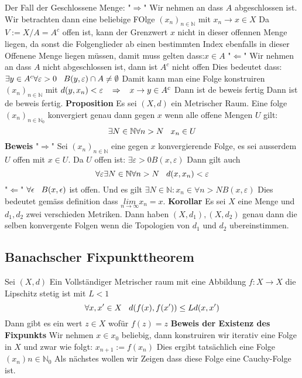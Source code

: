 \documentclass{article}
\newcommand{\mspc}{\hspace{0.3cm}}
\begin{document}
Der Fall der Geschlossene Menge:\newline
"$\Rightarrow$" Wir nehmen an dass $A$ abgeschlossen ist. Wir betrachten dann eine beliebige FOlge $(x_n)_{n\in\mathbb{N}}$ mit $x_n\rightarrow x\in X$ Da $V:=X/A=A^c$ offen ist, kann der Grenzwert $x$ nicht in dieser offennen Menge liegen, da sonst die Folgenglieder ab einen bestimmten Index ebenfalls in dieser Offenene Menge liegen müssen, damit muss gelten dass:$x\in A$\newline
"$\Leftarrow$" Wir nehmen an dass $A$ nicht abgeschlossen ist, dann ist $A^c$ nicht offen Dies bedeutet dass: $\exists y\in A^c \forall \varepsilon>0 \mspc B(y,\varepsilon) \cap A \neq \emptyset$ Damit kann man eine Folge konstruiren 
$(x_n)_{n\in\mathbb{N}}$ mit $d(y,x_n)<\varepsilon \mspc \Rightarrow\mspc x\rightarrow y\in A^c$ Dann ist de beweis fertig Dann ist de beweis fertig.\newline
\noindent
\textbf{Proposition} Es sei $(X,d)$ ein Metrischer Raum. Eine folge $(x_n)_{n\in\mathbb{N}_0}$ konvergiert genau dann gegen $x$ wenn alle offene Mengen $U$ gilt:\[\exists N\in \mathbb{N}\forall n>N\mspc x_n\in U\]\newline
\textbf{Beweis}
"$\Rightarrow$" Sei $(x_n)_{n\in\mathbb{N}}$ eine gegen $x$ konvergierende Folge, es sei ausserdem $U$ offen mit $x\in U$. Da $U$ offen ist: $\exists \varepsilon >0 B(x,\varepsilon)$ Dann gilt auch \[\forall \varepsilon \exists N\in\mathbb{N} \forall n>N \mspc d(x,x_n)<\varepsilon\]
\newline
"$\Leftarrow$" $\forall \epsilon \mspc B(x, \epsilon)$ ist offen. Und es gilt $\exists N\in\mathbb{N} : x_n\in\forall n>N B(x, \varepsilon)$ Dies bedeutet gemäss definition dass $\underset{n\rightarrow\infty}{lim} x_n=x$. \newline
\textbf{Korollar} Es sei $X$ eine Menge und $d_1, d_2$ zwei verschieden Metriken. Dann haben $(X,d_1), (X, d_2)$ genau dann die selben konvergente Folgen wenn die Topologien von $d_1$ und $d_2$ ubereinstimmen. 
\newline\subsection{Banachscher Fixpunkttheorem}
Sei $(X,d)$ Ein Vollständiger Metrischer raum mit eine Abbildung $f:X\rightarrow X$ die Lipschitz stetig ist mit $L<1$\[\forall x,x'\in X\mspc d(f(x),f(x'))\le Ld(x,x')\]
Dann gibt es ein wert $z\in X$ wofür $f(z)=z$
\newline
\textbf{Beweis der Existenz des Fixpunkts} Wir nehmen $x\in x_0$ beliebig, dann konstruiren wir iterativ eine Folge in $X$ und zwar wie folgt: $x_{n+1}:=f(x_n)$ Dies ergibt tatsächlich eine Folge $(x_n)n\in\mathbb{N}_0$ Als nächstes wollen wir Zeigen dass diese Folge eine Cauchy-Folge ist.
\end{document}
